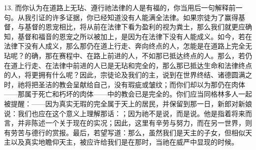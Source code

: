 13. 而你认为在道路上无玷、遵行祂法律的人是有福的，你当用后一句解释前一句。从我引证的许多证据，你已经知道没有人能满全法律。如果宗徒为了赢得基督，与基督的恩宠相比，将从前在法律下看为盈利的视为粪土，那么我们就更应确知，基督和福音的恩宠之所以被加上，是因为在法律下没有人能成义。如今，若在法律下没有人成义，那么那仍在道上行走、奔向终点的人，怎能是在道路上完全无玷呢？的确，那在赛程中、在路上前进的人，不如那已抵达终点的人。那么，若仍在道上行走、在法律中前进的人已是无玷和完全的，那么那已抵达生命和法律终点的人，将更拥有什么呢？因此，宗徒论及我们的主，说到在世界终结、诸德圆满之时，祂将把圣洁的教会呈献给自己，没有瑕疵或皱纹；而你们却以为那仍在肉体——那属于死亡和朽坏的肉体——中的教会已是完全的。你们应当同格林多人一起被提醒：——因为真实无瑕的完全属于天上的居民，并保留到那一日，新郎对新娘说：我们也应在这个意义上理解那话：；因为祂不是说，而是说。他是指着将来而言，并非陈述一个关于现在的实况；因此，这里有辛劳与努力，而在另一世界，则有劳苦与德行的赏报。最后，若望写道：那么，虽然我们是天主的子女，但相似天主以及真实地瞻仰天主，被应许给我们是在那时，当祂在威严中显现的时候。\par

